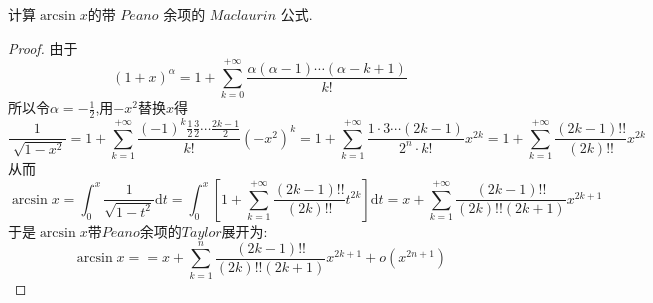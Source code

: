 \documentclass[lang=cn,newtx,10pt,scheme=chinese]{../Template/elegantbook}
\begin{document}
\begin{exercise}
   计算\(\arcsin x\)的带 $Peano$ 余项的 $Maclaurin$ 公式.
    \begin{proof}
    由于
    \begin{equation}
    (1+x)^\alpha =1+\sum_{k=0}^{+\infty}\frac{\alpha(\alpha-1)\cdots(\alpha-k+1)}{k!}
        \nonumber
    \end{equation}
    所以令$\alpha=-\frac{1}{2}$,用$-x^2$替换$x$得
    \begin{equation}
    \frac{1}{\sqrt[]{1-x^2} } =1+\sum_{k=1}^{+\infty}\frac{(-1)^k\frac{1}{2}\frac{3}{2}\cdots\frac{2k-1}{2}}{k!}(-x^2)^{k}
    =1+\sum_{k=1}^{+\infty}\frac{1\cdot3\cdots(2k-1)}{2^n\cdot k!}x^{2k}
    =1+\sum_{k=1}^{+\infty}\frac{(2k-1)!!}{(2k)!!}x^{2k}
        \nonumber
    \end{equation}
    从而
    \begin{equation}
    \arcsin x=\int_{0}^{x} \frac{1}{\sqrt{1-t^2}}\mathrm{d}t=\int_{0}^{x} [1+\sum_{k=1}^{+\infty}\frac{(2k-1)!!}{(2k)!!}t^{2k}]\mathrm{d}t
    =x+\sum_{k=1}^{+\infty}\frac{(2k-1)!!}{(2k)!!(2k+1)}x^{2k+1}
        \nonumber
    \end{equation}
    于是$\arcsin x$带$Peano$余项的$Taylor$展开为:
    \begin{equation}
    \arcsin x==x+\sum_{k=1}^{n}\frac{(2k-1)!!}{(2k)!!(2k+1)}x^{2k+1}+o(x^{2n+1})
        \nonumber
    \end{equation}
    
\end{proof}
\end{exercise}
\end{document}
